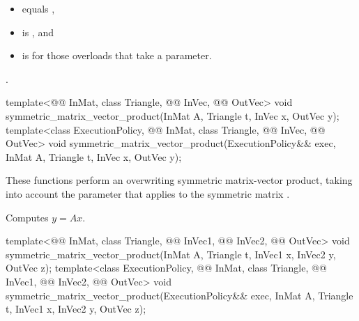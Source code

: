 \pnum
\expects
\begin{itemize}
\item
{} equals ,
\item
{} is , and
\item
{} is 
for those overloads that take a  parameter.
\end{itemize}

\pnum
\complexity
{}.

%
\begin{itemdecl}
template<@@ InMat, class Triangle, @@ InVec, @@ OutVec>
  void symmetric_matrix_vector_product(InMat A, Triangle t, InVec x, OutVec y);
template<class ExecutionPolicy,
         @@ InMat, class Triangle, @@ InVec, @@ OutVec>
  void symmetric_matrix_vector_product(ExecutionPolicy&& exec,
                                       InMat A, Triangle t, InVec x, OutVec y);
\end{itemdecl}

\begin{itemdescr}

\pnum
These functions perform an overwriting symmetric matrix-vector product,
taking into account the  parameter
that applies to the symmetric matrix .

\pnum
\effects
Computes $y = A x$.
\end{itemdescr}

%
\begin{itemdecl}
template<@@ InMat, class Triangle, @@ InVec1, @@ InVec2, @@ OutVec>
  void symmetric_matrix_vector_product(InMat A, Triangle t, InVec1 x, InVec2 y, OutVec z);
template<class ExecutionPolicy,
         @@ InMat, class Triangle, @@ InVec1, @@ InVec2, @@ OutVec>
  void symmetric_matrix_vector_product(ExecutionPolicy&& exec,
                                       InMat A, Triangle t, InVec1 x, InVec2 y, OutVec z);
\end{itemdecl}

